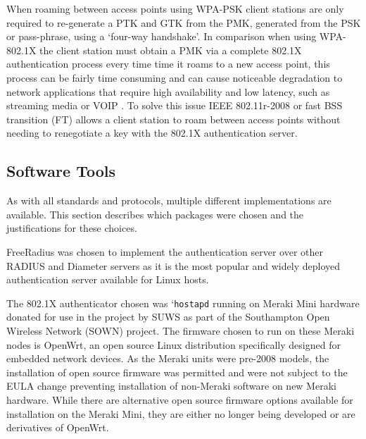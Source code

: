 \documentclass[pdftex, 12pt, a4paper]{article}
\begin{document}
When roaming between access points using WPA-PSK client stations are only required to re-generate a PTK and GTK from the PMK, generated from the PSK or pass-phrase, using a `four-way handshake'\cite{IEEE80211i-2004}.  In comparison when using WPA-802.1X the client station must obtain a PMK via a complete 802.1X authentication process every time time it roams to a new access point, this process can be fairly time consuming and can cause noticeable degradation to network applications that require high availability and low latency, such as streaming media or VOIP \cite{voip-time}.  To solve this issue IEEE 802.11r-2008 or fast BSS transition (FT) allows a client station to roam between access points without needing to renegotiate a key with the 802.1X authentication server.


\subsection{Software Tools}
As with all standards and protocols, multiple different implementations are available.  This section describes which packages were chosen and the justifications for these choices.

FreeRadius was chosen to implement the authentication server over other RADIUS and Diameter servers as it is the most popular and widely deployed authentication server available for Linux hosts.

The 802.1X authenticator chosen was `\verb`hostapd` running on Meraki Mini hardware donated for use in the project by SUWS as part of the Southampton Open Wireless Network (SOWN) project.  The firmware chosen to run on these Meraki nodes is OpenWrt, an open source Linux distribution specifically designed for embedded network devices. As the Meraki units were pre-2008 models, the installation of open source firmware was permitted and were not subject to the EULA change preventing installation of non-Meraki software on new Meraki hardware. While there are alternative open source firmware options available for installation on the Meraki Mini, they are either no longer being developed or are derivatives of OpenWrt\cite{meraki-eula}.

\end{document}
